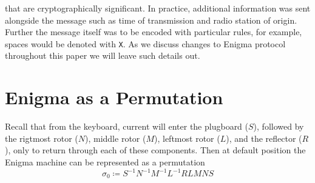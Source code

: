 that are cryptographically significant. In practice, additional
information was sent alongside the message such as time of
transmission and radio station of origin. Further the message itself
was to be encoded with particular rules, for example, spaces would be
denoted with \texttt{X}. As we discuss changes to Enigma protocol
throughout this paper we will leave such details out.


\section{Enigma as a Permutation}

Recall that from the keyboard, current will enter the plugboard
($S$), followed by the rigtmost rotor ($N$), middle
rotor ($M$), leftmost rotor ($L$), and the reflector ($R$), only to
return through each of these components. Then at default position the
Enigma machine can be represented as a permutation
\[
	\sigma_0 \coloneq S^{-1}N^{-1}M^{-1}L^{-1}RLMNS
\]

